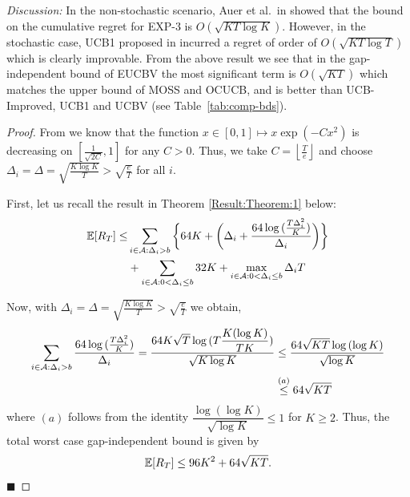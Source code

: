 \emph{Discussion:} In the non-stochastic scenario, Auer et al.\ in \cite{auer2002nonstochastic} showed that the bound on the cumulative regret for EXP-3 is $O\left(\sqrt{KT\log K}\right)$. However, in the stochastic case, UCB1 proposed in \cite{auer2002finite} incurred a regret of order of  $O\left(\sqrt{KT\log T}\right)$ which is clearly improvable. From the above result we see that in the gap-independent bound of EUCBV the most significant term is $O\left(\sqrt{KT}\right)$ which  matches the upper bound of MOSS and OCUCB, and is better than UCB-Improved, UCB1 and UCBV (see Table~\ref{tab:comp-bds}).


\begin{proof}
\label{Proof:Corollary:1}
From \cite{bubeck2011pure}  we know that the function $x\in [0,1]\mapsto x\exp(-Cx^2)$ is  decreasing on $\left[\frac{1}{\sqrt{2C}},1\right ]$ for any $C>0$. Thus, we take $C=\left\lfloor \frac{T}{e}\right\rfloor$ and choose  $\Delta_{i}=\Delta=\sqrt{\frac{K\log K}{T}}>\sqrt{\frac{e}{T}}$ for all $i$.

First, let us recall the result in Theorem \ref{Result:Theorem:1} below:
\begin{align*}
\mathbb{E} [R_{T}] \leq &\sum\limits_{i\in \mathcal{A} :\Delta_{i} > b}\bigg\lbrace 64 K + \bigg(\Delta_{i}+\dfrac{64\log{(\frac{T\Delta_{i}^{2}}{K})}}{\Delta_{i}}\bigg)\bigg \rbrace\\ 
  & +\sum\limits_{i\in \mathcal{A} :0 < \Delta_{i}\leq b} 32 K + \max_{i\in \mathcal{A} :0 < \Delta_{i}\leq b}\Delta_{i}T  
\end{align*}

Now,  with  $\Delta_i =\Delta = \sqrt{\frac{K\log K}{T}}>\sqrt{\frac{e}{T}}$ we obtain,
	\begin{align*}
	\sum_{i\in \mathcal{A} :\Delta_{i} > b}\dfrac{64\log{(\frac{T\Delta_{i}^{2}}{K})}}{\Delta_{i}} = \dfrac{64K\sqrt{T}\log{(T\dfrac{K(\log K)}{T K})}}{\sqrt{K\log K}} &\leq  \dfrac{64\sqrt{KT}\log{(\log K)}}{\sqrt{\log K}}\\
	&\overset{(a)}{\leq} 64\sqrt{KT} 
	\end{align*}		
	where $(a)$ follows from the identity $\dfrac{\log{(\log K)}}{\sqrt{\log K}}\leq 1$ for $K\geq 2$. Thus, the total worst case gap-independent bound is given by
	\begin{align*}
	\mathbb{E}[R_{T}]\leq 96 K^2 + 64\sqrt{KT}.
	\end{align*}	
\hfill $\blacksquare$	
\end{proof}
